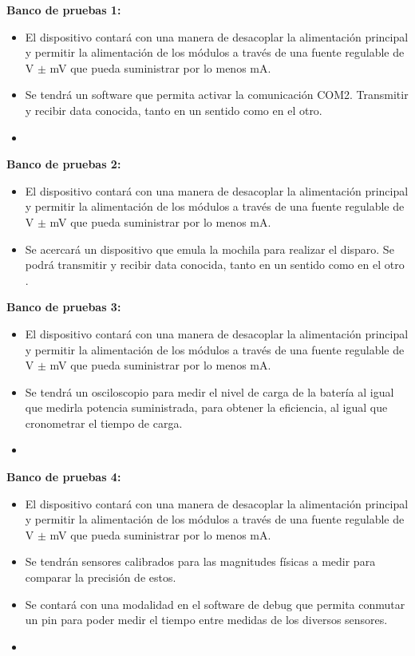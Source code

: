 
\textbf{Banco de pruebas 1:}
\begin{itemize}
	\item El dispositivo contará con una manera de desacoplar la alimentación principal y permitir la alimentación de los módulos a través de una fuente regulable de \TBD V $\pm$ \TBD mV que pueda suministrar por lo menos \TBD mA.
	\item Se tendrá un software que permita activar  la comunicación COM2. Transmitir y recibir data conocida, tanto en un sentido como en el otro.
	\item \TBC
\end{itemize}

\textbf{Banco de pruebas 2:}
\begin{itemize}
	\item El dispositivo contará con una manera de desacoplar la alimentación principal y permitir la alimentación de los módulos a través de una fuente regulable de \TBD V $\pm$ \TBD mV que pueda suministrar por lo menos \TBD mA.
	\item Se acercará un dispositivo que emula la mochila para realizar el disparo. Se podrá transmitir y recibir data conocida, tanto en un sentido como en el otro \TBC.
\end{itemize}

\textbf{Banco de pruebas 3:}
\begin{itemize}
	\item El dispositivo contará con una manera de desacoplar la alimentación principal y permitir la alimentación de los módulos a través de una fuente regulable de \TBD V $\pm$ \TBD mV que pueda suministrar por lo menos \TBD mA.
	\item Se tendrá un osciloscopio para medir el nivel de carga de la batería al igual que medirla potencia suministrada, para obtener la eficiencia, al igual que cronometrar el tiempo de carga.
	\item \TBC
\end{itemize}

\textbf{Banco de pruebas 4:}
\begin{itemize}
	\item El dispositivo contará con una manera de desacoplar la alimentación principal y permitir la alimentación de los módulos a través de una fuente regulable de \TBD V $\pm$ \TBD mV que pueda suministrar por lo menos \TBD mA.
	\item Se tendrán sensores calibrados para las magnitudes físicas a medir para comparar la precisión de estos.
	\item Se contará con una modalidad en el software de debug que permita conmutar un pin para poder medir el tiempo entre medidas de los diversos sensores.
	\item \TBC
\end{itemize}

